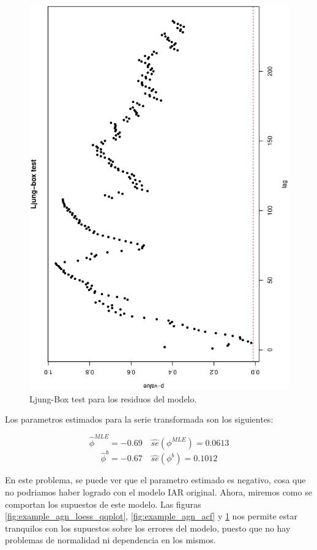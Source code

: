 \begin{figure}[h]
\begin{minipage}{0.45\textwidth}
        \includegraphics[width=0.8\linewidth,angle = 270]{Kap3/Fig_Cap3/agn_ljung.eps}
        
        \caption{Ljung-Box test para los residuos del modelo.}
        \label{fig:agn_ljung}
    \end{minipage}
\end{figure}

Los parametros estimados para la serie transformada son los siguientes:

$$\hat{\phi}^{MLE}= -0.69 \quad \hat{se}(\phi^{MLE})=0.0613 $$
$$\hat{\phi}^{b}= -0.67 \quad \hat{se}(\phi^{b})=0.1012 $$

En este problema, se puede ver que el parametro estimado es negativo, cosa que no podriamos haber logrado con el modelo IAR original. Ahora, miremos como se comportan los supuestos de este modelo. Las figuras \ref{fig:example_agn_loess_qqplot}, \ref{fig:example_agn_acf} y \ref{fig:agn_ljung} nos permite estar tranquilos con los supuestos sobre los errores del modelo, puesto que no hay problemas de normalidad ni dependencia en los mismos.